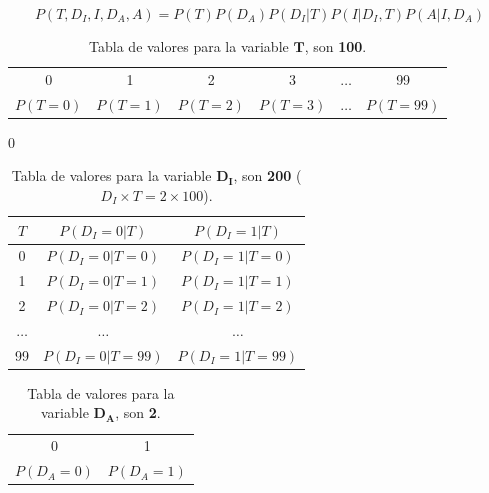 \documentclass[12pt]{article}
\begin{document}
  \begin{equation}
  P(T,D_I,I,D_A,A)=P(T)P(D_A)P(D_I|T)P(I|D_I,T)P(A|I,D_A)
  \end{equation}
\begin{table}[h!]
	\centering
	\begin{tabular}{|c|c|c|c|c|c|}
		\hline
		\rowcolor[gray]{.8}
		\multicolumn{6}{|c|}{$P(T)$} \\\hline %
		\rowcolor[gray]{.8}
		0 & 1 & 2 & 3 & $\dots$ & 99\\\hline
		$P(T=0)$ & $P(T=1)$ & $P(T=2)$ & $P(T=3)$ & $\dots$ & $P(T=99)$\\\hline
	\end{tabular}
	\caption{Tabla de valores para la variable $\pmb{T}$, son \textbf{100}.}
	\label{tab:ej1006}0
\end{table}
\begin{table}[h!]
	\centering
	\begin{tabular}{|c|c|c|}
		\hline
		\rowcolor[gray]{.8}
		$T$&$P(D_I=0|T)$&$P(D_I=1|T)$ \\\hline %
		0 & $P(D_I=0|T=0)$ &$P(D_I=1|T=0)$\\\hline
		1 & $P(D_I=0|T=1)$ &$P(D_I=1|T=1)$\\\hline
		2 & $P(D_I=0|T=2)$ &$P(D_I=1|T=2)$\\\hline
		$\dots$ & $\dots$ &$\dots$\\\hline
		99 & $P(D_I=0|T=99)$ &$P(D_I=1|T=99)$\\\hline
	\end{tabular}
	\caption{Tabla de valores para la variable $\pmb{D_I}$, son \textbf{200} ($D_I\times T=2\times 100$).}
	\label{tab:ej1007}
\end{table}
\begin{table}[h!]
	\centering
	\begin{tabular}{|c|c|}
		\hline
		\rowcolor[gray]{.8}
		\multicolumn{2}{|c|}{$P(D_A)$} \\\hline %
		\rowcolor[gray]{.8}
		0 & 1 \\\hline
		$P(D_A=0)$ & $P(D_A=1)$\\\hline
	\end{tabular}
	\caption{Tabla de valores para la variable $\pmb{D_A}$, son \textbf{2}.}
	\label{tab:ej1008}
\end{table}
\end{document}
